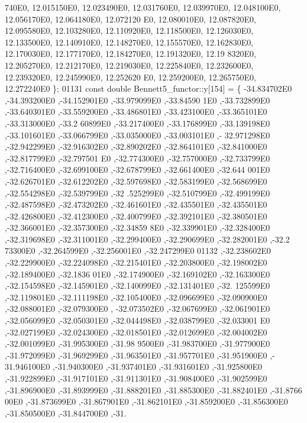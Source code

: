 \begin{DoxyCode}
      740E0, 12.015150E0, 12.023490E0, 12.031760E0, 12.039970E0, 12.048100E0, 12.056170E0, 12.064180E0, 12.072120
      E0, 12.080010E0, 12.087820E0, 12.095580E0, 12.103280E0, 12.110920E0, 12.118500E0, 12.126030E0, 12.133500E0, 
      12.140910E0, 12.148270E0, 12.155570E0, 12.162830E0, 12.170030E0, 12.177170E0, 12.184270E0, 12.191320E0, 12.19
      8320E0, 12.205270E0, 12.212170E0, 12.219030E0, 12.225840E0, 12.232600E0, 12.239320E0, 12.245990E0, 12.252620
      E0, 12.259200E0, 12.265750E0, 12.272240E0 \};
01131 \textcolor{keyword}{const} \textcolor{keywordtype}{double} Bennett5\_functor::y[154] = \{ -34.834702E0 ,-34.393200E0 ,-34.152901E0 ,-33.979099E0 ,-33.84590
      1E0 ,-33.732899E0 ,-33.640301E0 ,-33.559200E0 ,-33.486801E0 ,-33.423100E0 ,-33.365101E0 ,-33.313000E0 ,-33.2
      60899E0 ,-33.217400E0 ,-33.176899E0 ,-33.139198E0 ,-33.101601E0 ,-33.066799E0 ,-33.035000E0 ,-33.003101E0 ,-
      32.971298E0 ,-32.942299E0 ,-32.916302E0 ,-32.890202E0 ,-32.864101E0 ,-32.841000E0 ,-32.817799E0 ,-32.797501
      E0 ,-32.774300E0 ,-32.757000E0 ,-32.733799E0 ,-32.716400E0 ,-32.699100E0 ,-32.678799E0 ,-32.661400E0 ,-32.644
      001E0 ,-32.626701E0 ,-32.612202E0 ,-32.597698E0 ,-32.583199E0 ,-32.568699E0 ,-32.554298E0 ,-32.539799E0 ,-32
      .525299E0 ,-32.510799E0 ,-32.499199E0 ,-32.487598E0 ,-32.473202E0 ,-32.461601E0 ,-32.435501E0 ,-32.435501E0 
      ,-32.426800E0 ,-32.412300E0 ,-32.400799E0 ,-32.392101E0 ,-32.380501E0 ,-32.366001E0 ,-32.357300E0 ,-32.34859
      8E0 ,-32.339901E0 ,-32.328400E0 ,-32.319698E0 ,-32.311001E0 ,-32.299400E0 ,-32.290699E0 ,-32.282001E0 ,-32.2
      73300E0 ,-32.264599E0 ,-32.256001E0 ,-32.247299E0
01132 ,-32.238602E0 ,-32.229900E0 ,-32.224098E0 ,-32.215401E0 ,-32.203800E0 ,-32.198002E0 ,-32.189400E0 ,-32.1836
      01E0 ,-32.174900E0 ,-32.169102E0 ,-32.163300E0 ,-32.154598E0 ,-32.145901E0 ,-32.140099E0 ,-32.131401E0 ,-32.
      125599E0 ,-32.119801E0 ,-32.111198E0 ,-32.105400E0 ,-32.096699E0 ,-32.090900E0 ,-32.088001E0 ,-32.079300E0 ,
      -32.073502E0 ,-32.067699E0 ,-32.061901E0 ,-32.056099E0 ,-32.050301E0 ,-32.044498E0 ,-32.038799E0 ,-32.033001
      E0 ,-32.027199E0 ,-32.024300E0 ,-32.018501E0 ,-32.012699E0 ,-32.004002E0 ,-32.001099E0 ,-31.995300E0 ,-31.98
      9500E0 ,-31.983700E0 ,-31.977900E0 ,-31.972099E0 ,-31.969299E0 ,-31.963501E0 ,-31.957701E0 ,-31.951900E0 ,-
      31.946100E0 ,-31.940300E0 ,-31.937401E0 ,-31.931601E0 ,-31.925800E0 ,-31.922899E0 ,-31.917101E0 ,-31.911301E0
       ,-31.908400E0 ,-31.902599E0 ,-31.896900E0 ,-31.893999E0 ,-31.888201E0 ,-31.885300E0 ,-31.882401E0 ,-31.8766
      00E0 ,-31.873699E0 ,-31.867901E0 ,-31.862101E0 ,-31.859200E0 ,-31.856300E0 ,-31.850500E0 ,-31.844700E0 ,-31.

\end{DoxyCode}
